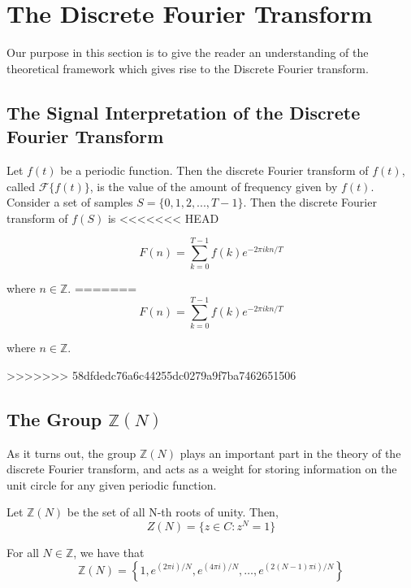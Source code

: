 \documentclass[../article.tex]{subfiles}
\begin{document}
\section{The Discrete Fourier Transform}
Our purpose in this section is to give the reader an understanding of the theoretical framework which gives rise to the Discrete Fourier transform.

\subsection{The Signal Interpretation of the Discrete Fourier Transform}

Let $f(t)$ be a periodic function. Then the discrete Fourier transform of $f(t)$, called $\mathcal{F}\{f(t)\}$, is the value of the amount of frequency given by $f(t)$. Consider a set of samples $S = \{0,1,2,...,T-1\}$. Then the discrete Fourier transform of $f(S)$ is
<<<<<<< HEAD

\[
F(n) = \sum_{k=0}^{T-1} f(k) e^{-2 \pi ikn/T}
\]

where $n \in \mathbb{Z}$.
=======
\begin{equation*}
F(n) = \sum_{k=0}^{T-1} f(k) e^{-2 \pi ikn/T}
\end{equation*}

where $n \in \mathbb{Z}$.

>>>>>>> 58dfdedc76a6c44255dc0279a9f7ba7462651506

\subsection{The Group $\mathbb{Z}(N)$}

As it turns out, the group $\mathbb{Z}(N)$ plays an important part in the theory of the discrete Fourier transform, and acts as a weight for storing information on the unit circle for any given periodic function.

\begin{definition}
Let $\mathbb{Z}(N)$ be the set of all N-th roots of unity. Then,
 \[Z(N) = \{z \in C : z^N = 1 \}\]
\end{definition}
\begin{theorem}
For all $N \in \mathbb{Z}$, we have that
\[\mathbb{Z}(N)= \left\{1, e^{(2 \pi i)/N}, e^{(4 \pi i)/N}, \ldots, e^{(2(N-1) \pi i)/N}\right\}\]
\end{theorem}
\end{document}
